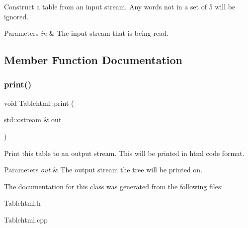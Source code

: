 Construct a table from an input stream. Any words not in a set of 5 will be ignored. 
\begin{DoxyParams}{Parameters}
{\em in} & The input stream that is being read. \\
\hline
\end{DoxyParams}


\subsection{Member Function Documentation}
\hypertarget{classasst04_1_1_tablehtml_a8cec3bade82ab4eaccbf74faf207bb2e}{}\label{classasst04_1_1_tablehtml_a8cec3bade82ab4eaccbf74faf207bb2e} 
\subsubsection{\texorpdfstring{print()}{print()}}
{\footnotesize\ttfamily void Tablehtml\+::print (\begin{DoxyParamCaption}\item[{std\+::ostream \&}]{out }\end{DoxyParamCaption})}

Print this table to an output stream. This will be printed in html code format. 
\begin{DoxyParams}{Parameters}
{\em out} & The output stream the tree will be printed on. \\
\hline
\end{DoxyParams}


The documentation for this class was generated from the following files\+:\begin{DoxyCompactItemize}
\item 
Tablehtml.\+h\item 
Tablehtml.\+cpp\end{DoxyCompactItemize}
